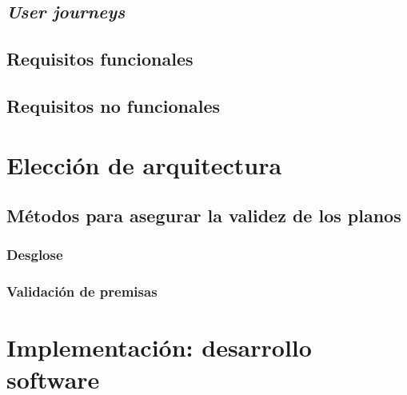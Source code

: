 
\subsection{\textit{User journeys}}


\subsection{Requisitos funcionales}

\subsection{Requisitos no funcionales}

\section{Elección de arquitectura}

\subsection{Métodos para asegurar la validez de los planos}

\subsubsection{Desglose}

\subsubsection{Validación de premisas}



\section{Implementación: desarrollo software}

